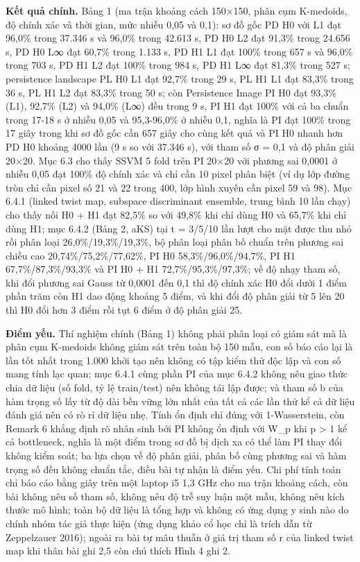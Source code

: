 \documentclass[12pt,a4paper]{article}
\begin{document}
\noindent \textbf{Kết quả chính.} Bảng 1 (ma trận khoảng cách 150×150, phân cụm K-medoids, độ chính xác và thời gian, mức nhiễu 0,05 và 0,1): sơ đồ gốc PD H0 với L1 đạt 96,0\% trong 37.346 s và 96,0\% trong 42.613 s, PD H0 L2 đạt 91,3\% trong 24.656 s, PD H0 L∞ đạt 60,7\% trong 1.133 s, PD H1 L1 đạt 100\% trong 657 s và 96,0\% trong 703 s, PD H1 L2 đạt 100\% trong 984 s, PD H1 L∞ đạt 81,3\% trong 527 s; persistence landscape PL H0 L1 đạt 92,7\% trong 29 s, PL H1 L1 đạt 83,3\% trong 36 s, PL H1 L2 đạt 83,3\% trong 50 s; còn Persistence Image PI H0 đạt 93,3\% (L1), 92,7\% (L2) và 94,0\% (L∞) đều trong 9 s, PI H1 đạt 100\% với cả ba chuẩn trong 17-18 s ở nhiễu 0,05 và 95,3-96,0\% ở nhiễu 0,1, nghĩa là PI đạt 100\% trong 17 giây trong khi sơ đồ gốc cần 657 giây cho cùng kết quả và PI H0 nhanh hơn PD H0 khoảng 4000 lần (9 s so với 37.346 s), với tham số σ = 0,1 và độ phân giải 20×20. Mục 6.3 cho thấy SSVM 5 fold trên PI 20×20 với phương sai 0,0001 ở nhiễu 0,05 đạt 100\% độ chính xác và chỉ cần 10 pixel phân biệt (ví dụ lớp đường tròn chỉ cần pixel số 21 và 22 trong 400, lớp hình xuyến cần pixel 59 và 98). Mục 6.4.1 (linked twist map, subspace discriminant ensemble, trung bình 10 lần chạy) cho thấy nối H0 + H1 đạt 82,5\% so với 49,8\% khi chỉ dùng H0 và 65,7\% khi chỉ dùng H1; mục 6.4.2 (Bảng 2, aKS) tại t = 3/5/10 lần lượt cho mặt được thu nhỏ rồi phân loại 26,0\%/19,3\%/19,3\%, bộ phân loại phân bố chuẩn trên phương sai chiều cao 20,74\%/75,2\%/77,62\%, PI H0 58,3\%/96,0\%/94,7\%, PI H1 67,7\%/87,3\%/93,3\% và PI H0 + H1 72,7\%/95,3\%/97,3\%; về độ nhạy tham số, khi đổi phương sai Gauss từ 0,0001 đến 0,1 thì độ chính xác H0 đổi dưới 1 điểm phần trăm còn H1 dao động khoảng 5 điểm, và khi đổi độ phân giải từ 5 lên 20 thì H0 đổi hơn 3 điểm rồi tụt 6 điểm ở độ phân giải 25.\par\vspace{3pt}
\noindent \textbf{Điểm yếu.} Thí nghiệm chính (Bảng 1) không phải phân loại có giám sát mà là phân cụm K-medoids không giám sát trên toàn bộ 150 mẫu, con số báo cáo lại là lần tốt nhất trong 1.000 khởi tạo nên không có tập kiểm thử độc lập và con số mang tính lạc quan; mục 6.4.1 cùng phần PI của mục 6.4.2 không nêu giao thức chia dữ liệu (số fold, tỷ lệ train/test) nên không tái lập được; và tham số b của hàm trọng số lấy từ độ dài bền vững lớn nhất của tất cả các lần thử kể cả dữ liệu đánh giá nên có rò rỉ dữ liệu nhẹ. Tính ổn định chỉ đúng với 1-Wasserstein, còn Remark 6 khẳng định rõ nhân sinh bởi PI không ổn định với W\_p khi p > 1 kể cả bottleneck, nghĩa là một điểm trong sơ đồ bị dịch xa có thể làm PI thay đổi không kiểm soát; ba lựa chọn về độ phân giải, phân bố cùng phương sai và hàm trọng số đều không chuẩn tắc, điều bài tự nhận là điểm yếu. Chi phí tính toán chỉ báo cáo bằng giây trên một laptop i5 1,3 GHz cho ma trận khoảng cách, còn bài không nêu số tham số, không nêu độ trễ suy luận một mẫu, không nêu kích thước mô hình; toàn bộ dữ liệu là tổng hợp và không có ứng dụng y sinh nào do chính nhóm tác giả thực hiện (ứng dụng khảo cổ học chỉ là trích dẫn từ Zeppelzauer 2016); ngoài ra bài tự mâu thuẫn ở giá trị tham số r của linked twist map khi thân bài ghi 2,5 còn chú thích Hình 4 ghi 2.\par\vspace{3pt}
\end{document}
